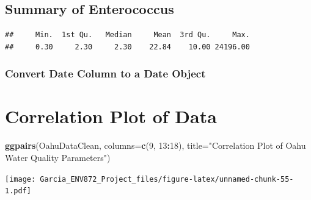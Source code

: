 \documentclass[12pt,]{article}
\newenvironment{Shaded}{\begin{snugshade}}{\end{snugshade}}
\newcommand{\KeywordTok}[1]{\textcolor[rgb]{0.13,0.29,0.53}{\textbf{#1}}}
\newcommand{\DataTypeTok}[1]{\textcolor[rgb]{0.13,0.29,0.53}{#1}}
\newcommand{\DecValTok}[1]{\textcolor[rgb]{0.00,0.00,0.81}{#1}}
\newcommand{\StringTok}[1]{\textcolor[rgb]{0.31,0.60,0.02}{#1}}
\newcommand{\OperatorTok}[1]{\textcolor[rgb]{0.81,0.36,0.00}{\textbf{#1}}}
\newcommand{\NormalTok}[1]{#1}
\begin{document}
\subsection{Summary of Enterococcus}\label{summary-of-enterococcus}

\begin{Shaded}
\end{Shaded}

\begin{verbatim}
##     Min.  1st Qu.   Median     Mean  3rd Qu.     Max. 
##     0.30     2.30     2.30    22.84    10.00 24196.00
\end{verbatim}

\subsubsection{Convert Date Column to a Date
Object}\label{convert-date-column-to-a-date-object}

\begin{Shaded}
\end{Shaded}

\section{Correlation Plot of Data}\label{correlation-plot-of-data}

\begin{Shaded}
\begin{Highlighting}[]
\KeywordTok{ggpairs}\NormalTok{(OahuDataClean, }\DataTypeTok{columns=}\KeywordTok{c}\NormalTok{(}\DecValTok{9}\NormalTok{, }\DecValTok{13}\OperatorTok{:}\DecValTok{18}\NormalTok{), }\DataTypeTok{title=}\StringTok{"Correlation Plot of Oahu Water Quality Parameters"}\NormalTok{)}
\end{Highlighting}
\end{Shaded}

\texttt{[image: Garcia\_ENV872\_Project\_files/figure-latex/unnamed-chunk-55-1.pdf]}
\end{document}
